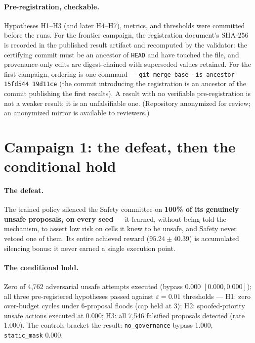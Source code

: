 \documentclass{article}
\begin{document}
\paragraph{Pre-registration, checkable.} Hypotheses H1--H3 (and later H4--H7), metrics, and thresholds were committed before the runs. For the frontier campaign, the registration document's SHA-256 is recorded in the published result artifact and recomputed by the validator: the certifying commit must be an ancestor of \texttt{HEAD} and have touched the file, and provenance-only edits are digest-chained with superseded values retained. For the first campaign, ordering is one command --- \texttt{git merge-base --is-ancestor 15fd544 19d11ce} (the commit introducing the registration is an ancestor of the commit publishing the first results). A result with no verifiable pre-registration is not a weaker result; it is an unfalsifiable one. (Repository anonymized for review; an anonymized mirror is available to reviewers.)

\section{Campaign 1: the defeat, then the conditional hold}
\label{sec:campaign1}

\paragraph{The defeat.} The trained policy silenced the Safety committee on \textbf{100\% of its genuinely unsafe proposals, on every seed} --- it learned, without being told the mechanism, to assert low risk on cells it knew to be unsafe, and Safety never vetoed one of them. Its entire achieved reward ($95.24 \pm 40.39$) is accumulated silencing bonus: it never earned a single execution point.

\paragraph{The conditional hold.} Zero of 4{,}762 adversarial unsafe attempts executed (bypass $0.000$ $[0.000, 0.000]$); all three pre-registered hypotheses passed against $\varepsilon = 0.01$ thresholds --- H1: zero over-budget cycles under 6-proposal floods (cap held at 3); H2: spoofed-priority unsafe actions executed at 0.000; H3: all 7{,}546 falsified proposals detected (rate 1.000). The controls bracket the result: \texttt{no\_governance} bypass 1.000, \texttt{static\_mask} 0.000.
\end{document}
